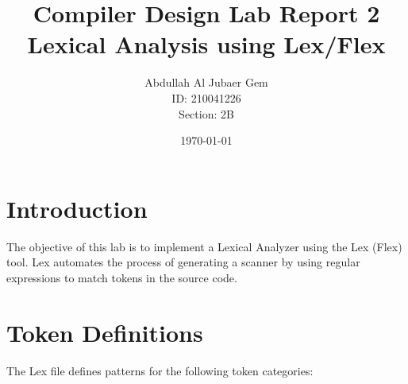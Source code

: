 \documentclass{article}
\title{Compiler Design Lab Report 2\\Lexical Analysis using Lex/Flex}
\author{Abdullah Al Jubaer Gem\\ID: 210041226\\Section: 2B}
\date{\today}
\begin{document}
\maketitle

\section{Introduction}
The objective of this lab is to implement a Lexical Analyzer using the Lex (Flex) tool. Lex automates the process of generating a scanner by using regular expressions to match tokens in the source code.

\section{Token Definitions}
The Lex file defines patterns for the following token categories:
\end{document}
